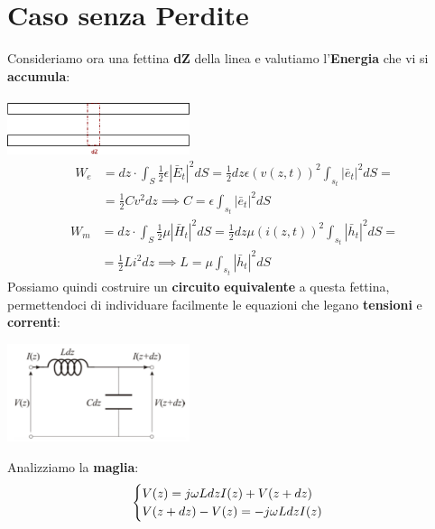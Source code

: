 \section{Caso senza Perdite}
Consideriamo ora una fettina \textbf{dZ} della linea e valutiamo l'\textbf{Energia} che vi si \textbf{accumula}:\\ \\
\includegraphics[width=0.4\textwidth]{Images/figure3.png}
\begin{equation*}
    \begin{aligned}
    W_e &= dz \cdot \int_S \frac{1}{2} \epsilon |\bar{E}_t|^2 dS = \frac{1}{2} dz \epsilon {(v(z,t))}^2 \int_{s_t} |\bar{e}_t|^2 dS = \\
    &= \frac{1}{2} C v^2 dz \implies C = \epsilon \int_{s_t} |\bar{e}_t|^2 dS
    \end{aligned}
\end{equation*}
\begin{equation*}
    \begin{aligned}
    W_m &= dz \cdot \int_S \frac{1}{2} \mu |\bar{H}_t|^2 dS = \frac{1}{2} dz \mu {(i(z,t))}^2 \int_{s_t} |\bar{h}_t|^2 dS = \\
    &= \frac{1}{2} L i^2 dz \implies L = \mu \int_{s_t} |\bar{h}_t|^2 dS
    \end{aligned}
\end{equation*}
Possiamo quindi costruire un \textbf{circuito} \textbf{equivalente} a questa fettina, permettendoci di individuare facilmente le equazioni che legano \textbf{tensioni} e \textbf{correnti}:
\begin{center}
    \includegraphics[width=0.4\textwidth]{Images/figure4.png}
\end{center}
Analizziamo la \textbf{maglia}:
\begin{equation*}
    \begin{cases}
    V(z) = j\omega L dz I(z) + V(z+dz)\\
    V(z+dz) - V(z) = - j\omega L dz I(z)
    \end{cases}
\end{equation*}
